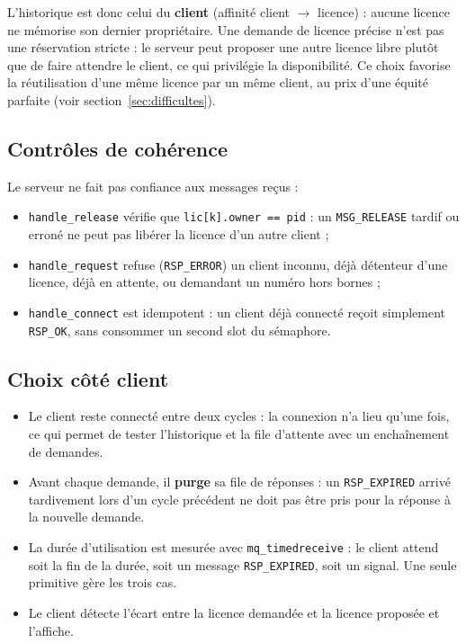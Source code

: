 \documentclass[11pt,a4paper]{article}
\newcommand{\code}[1]{\texttt{#1}}
\begin{document}
L'historique est donc celui du \textbf{client} (affinité client $\rightarrow$ licence) : aucune licence ne mémorise son dernier propriétaire. Une demande de licence précise n'est pas une réservation stricte : le serveur peut proposer une autre licence libre plutôt que de faire attendre le client, ce qui privilégie la disponibilité. Ce choix favorise la réutilisation d'une même licence par un même client, au prix d'une équité parfaite (voir section~\ref{sec:difficultes}).

\subsection{Contrôles de cohérence}

Le serveur ne fait pas confiance aux messages reçus :
\begin{itemize}
  \item \code{handle\_release} vérifie que \code{lic[k].owner == pid} : un \code{MSG\_RELEASE} tardif ou erroné ne peut pas libérer la licence d'un autre client ;
  \item \code{handle\_request} refuse (\code{RSP\_ERROR}) un client inconnu, déjà détenteur d'une licence, déjà en attente, ou demandant un numéro hors bornes ;
  \item \code{handle\_connect} est idempotent : un client déjà connecté reçoit simplement \code{RSP\_OK}, sans consommer un second slot du sémaphore.
\end{itemize}

\subsection{Choix côté client}

\begin{itemize}
  \item Le client reste connecté entre deux cycles : la connexion n'a lieu qu'une fois, ce qui permet de tester l'historique et la file d'attente avec un enchaînement de demandes.
  \item Avant chaque demande, il \textbf{purge} sa file de réponses : un \code{RSP\_EXPIRED} arrivé tardivement lors d'un cycle précédent ne doit pas être pris pour la réponse à la nouvelle demande.
  \item La durée d'utilisation est mesurée avec \code{mq\_timedreceive} : le client attend soit la fin de la durée, soit un message \code{RSP\_EXPIRED}, soit un signal. Une seule primitive gère les trois cas.
  \item Le client détecte l'écart entre la licence demandée et la licence proposée et l'affiche.
\end{itemize}
\end{document}

